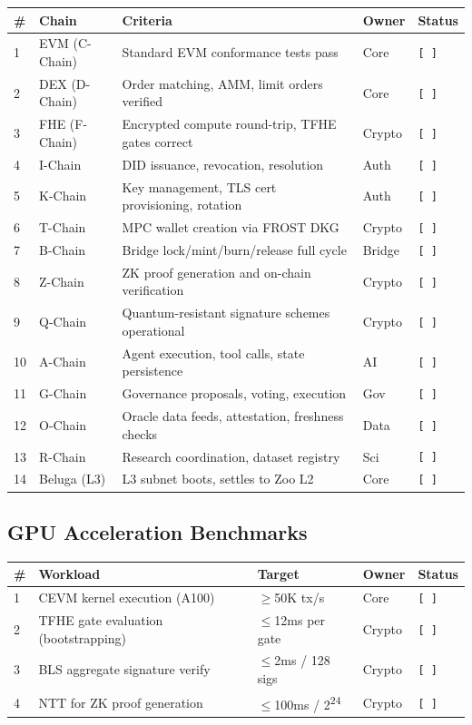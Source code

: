 \documentclass[11pt,letterpaper]{article}
\newcommand{\pending}{\texttt{[ ]}}
\begin{document}
\begin{tabularx}{\textwidth}{@{}l l X l l@{}}
\toprule
\textbf{\#} & \textbf{Chain} & \textbf{Criteria} & \textbf{Owner} & \textbf{Status} \\
\midrule
1  & EVM (C-Chain)  & Standard EVM conformance tests pass              & Core   & \pending \\
2  & DEX (D-Chain)  & Order matching, AMM, limit orders verified        & Core   & \pending \\
3  & FHE (F-Chain)  & Encrypted compute round-trip, TFHE gates correct  & Crypto & \pending \\
4  & I-Chain        & DID issuance, revocation, resolution              & Auth   & \pending \\
5  & K-Chain        & Key management, TLS cert provisioning, rotation   & Auth   & \pending \\
6  & T-Chain        & MPC wallet creation via FROST DKG                 & Crypto & \pending \\
7  & B-Chain        & Bridge lock/mint/burn/release full cycle           & Bridge & \pending \\
8  & Z-Chain        & ZK proof generation and on-chain verification      & Crypto & \pending \\
9  & Q-Chain        & Quantum-resistant signature schemes operational    & Crypto & \pending \\
10 & A-Chain        & Agent execution, tool calls, state persistence     & AI     & \pending \\
11 & G-Chain        & Governance proposals, voting, execution            & Gov    & \pending \\
12 & O-Chain        & Oracle data feeds, attestation, freshness checks   & Data   & \pending \\
13 & R-Chain        & Research coordination, dataset registry            & Sci    & \pending \\
14 & Beluga (L3)    & L3 subnet boots, settles to Zoo L2                & Core   & \pending \\
\bottomrule
\end{tabularx}

\subsection{GPU Acceleration Benchmarks}

\begin{tabularx}{\textwidth}{@{}l X l l l@{}}
\toprule
\textbf{\#} & \textbf{Workload} & \textbf{Target} & \textbf{Owner} & \textbf{Status} \\
\midrule
1 & CEVM kernel execution (A100)       & $\geq$50K tx/s          & Core   & \pending \\
2 & TFHE gate evaluation (bootstrapping)& $\leq$12ms per gate     & Crypto & \pending \\
3 & BLS aggregate signature verify      & $\leq$2ms / 128 sigs   & Crypto & \pending \\
4 & NTT for ZK proof generation          & $\leq$100ms / 2\textsuperscript{24} & Crypto & \pending \\
\bottomrule
\end{tabularx}
\end{document}
